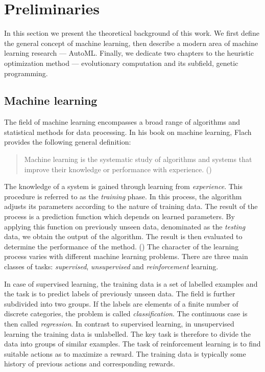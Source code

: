 \chapter{Preliminaries}

In this section we present the theoretical background of this work. We first
define the general concept of machine learning, then describe a modern area
of machine learning research --- AutoML. Finally, we dedicate two chapters to
the heuristic optimization method --- evolutionary computation and its subfield,
genetic programming.

\section{Machine learning}
The field of machine learning encompasses a broad range of algorithms and
statistical methods for data processing. In his book on machine learning,
Flach provides the following general definition:

\blockquote{Machine learning is the systematic study of algorithms and systems
that improve their knowledge or performance with experience.
(\cite{Flach:2012:MLA:2490546})} %
%
%
The knowledge of a system is gained through learning from \emph{experience}.
This procedure is referred to as the \emph{training} phase. In this process, 
the algorithm adjusts its parameters according to the nature of training data.
The result of the process is a prediction function which depends on learned
parameters. By applying this function on previously unseen data, denominated 
as the \emph{testing} data, we obtain the output of the algorithm. The 
result is then evaluated to determine the performance of the method. 
(\cite{Bishop:2006:PRM:1162264}) The character of the learning process
varies with different machine learning problems. There are three main classes 
of tasks: \emph{supervised}, \emph{unsupervised} and \emph{reinforcement} 
learning.

In case of supervised learning, the training data is a set of labelled examples
and the task is to predict labels of previously unseen data. The field is 
further subdivided into two groups. If the labels are elements of a finite 
number of discrete categories, the problem is called \emph{classification}. 
The continuous case is then called \emph{regression}.
In contrast to supervised learning, in unsupervised learning the training data 
is unlabelled. The key task is therefore to divide the data into groups of 
similar examples. The task of reinforcement learning is to find suitable actions as to maximize 
a reward. The training data is typically some history of previous actions 
and corresponding rewards.

